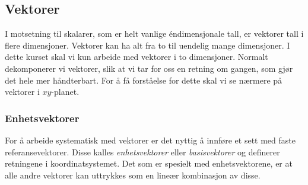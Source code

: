 
\subsection{Vektorer}
I motsetning til skalarer, som er helt vanlige éndimensjonale tall, er vektorer tall i flere dimensjoner. Vektorer kan ha alt fra to til uendelig mange dimensjoner. I dette kurset skal vi kun arbeide med vektorer i to dimensjoner. Normalt dekomponerer vi vektorer, slik at vi tar for oss en retning om gangen, som gjør det hele mer håndterbart. For å få forståelse for dette skal vi se nærmere på vektorer i $xy$-planet.



\subsubsection{Enhetsvektorer}

For å arbeide systematisk med vektorer er det nyttig å innføre et sett med faste referansevektorer. Disse kalles \emph{enhetsvektorer} eller \emph{basisvektorer} og definerer retningene i koordinatsystemet. Det som er spesielt med enhetsvektorene, er at alle andre vektorer kan uttrykkes som en lineær kombinasjon av disse.


